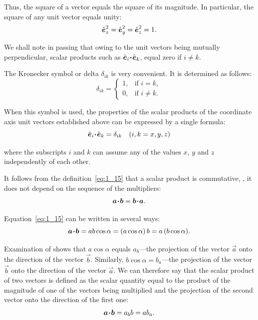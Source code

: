 \noindent
Thus, the square of a vector equals the square of its magnitude. In particular, the square of any unit vector equals unity:
\begin{equation}\label{eq:1_17}
\hat{\boldsymbol{e}}_{x}^2 = \hat{\boldsymbol{e}}_{y}^2 = \hat{\boldsymbol{e}}_{z}^2 = 1.
\end{equation}

\noindent
We shall note in passing that owing to the unit vectors being mutually perpendicular, scalar products such as $\hat{\boldsymbol{e}}_{i}\!\boldsymbol{\cdot}\!\hat{\boldsymbol{e}}_{k}$, equal zero if $i\neq k$.

The Kronecker symbol or delta $\delta_{ik}$ is very convenient. It is determined as follows:
\begin{equation}\label{eq:1_18}
\delta_{ik} = \begin{cases}
1, &\mbox{if } i = k, \\
0, &\mbox{if } i\neq k. \end{cases}
\end{equation}

\noindent
When this symbol is used, the properties of the scalar products of the coordinate axis unit vectors established above can be expressed by a single formula:
\begin{equation}\label{eq:1_19}
\hat{\boldsymbol{e}}_{i}\!\boldsymbol{\cdot}\!\hat{\boldsymbol{e}}_{k} = \delta_{ik}\quad (i, k = x, y, z)
\end{equation}

\noindent
where the subscripts $i$ and $k$ can assume any of the values $x$, $y$ and $z$ independently of each other.

It follows from the definition~\eqref{eq:1_15} that a scalar product is commutative, \ie, it does not depend on the sequence of the multipliers:
\begin{equation}\label{eq:1_20}
\boldsymbol{a\!\cdot\!b} = \boldsymbol{b\!\cdot\!a}.
\end{equation}

\noindent
Equation~\eqref{eq:1_15} can be written in several ways:
\begin{equation*}
\boldsymbol{a\!\cdot\!b} = ab\cos\alpha = (a\cos\alpha)\,b = a\,(b\cos\alpha).
\end{equation*}

\noindent
Examination of  shows that $a\cos\alpha$ equals $a_b$---the projection of the vector $\vec{a}$ onto the direction of the vector $\vec{b}$. Similarly, $b\cos\alpha= b_a$---the projection of the vector $\vec{b}$ onto the direction of the vector $\vec{a}$. We can therefore say that the scalar product of two vectors is defined as the scalar quantity equal to the product of the magnitude of one of the vectors being multiplied and the projection of the second vector onto the direction of the first one:
\begin{equation}\label{eq:1_21}
\boldsymbol{a\!\cdot\!b} = a_b b = a b_a.
\end{equation}


